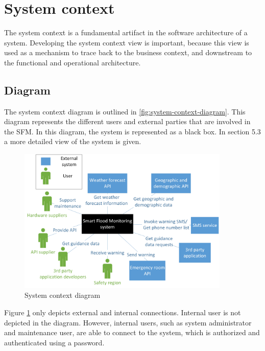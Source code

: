 \section{System context}
\label{sec:system-context}
The system context is a fundamental artifact in the software architecture of a system. Developing the system context view is important, because this view is used as a mechanism to trace back to the business context, and downstream to the functional and operational architecture.

\subsection{Diagram}
\label{subsec:system-diagram}
The system context diagram is outlined in \autoref{fig:system-context-diagram}. This diagram represents the different users and external parties that are involved in the SFM. In this diagram, the system is represented as a black box. In section 5.3 a more detailed view of the system is given. 

\begin{figure}[H]
	\centering
	\includegraphics[keepaspectratio=true,width=0.9\textwidth]{images/system_context.jpg}
	\caption{System context diagram}
	\label{fig:system-context-diagram}
\end{figure}

Figure \ref{fig:system-context-diagram} only depicts external and internal connections. Internal user is not depicted in the diagram. However, internal users, such as system administrator and maintenance user, are able to connect to the system, which is authorized and authenticated using a password.

